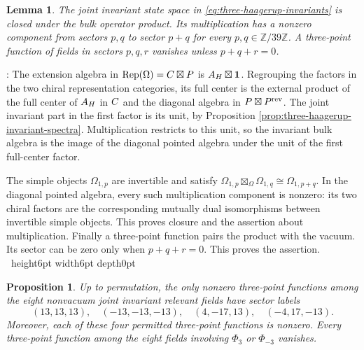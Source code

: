 \documentclass[leqno]{article}
\let\cal\relax
\newcommand{\cal}{\mathcal}
\newcommand{\Z}{\ensuremath{\mathbb{Z}}}
\newcommand{\qed}{\hfill \vrule height6pt  width6pt depth0pt}
\DeclareMathOperator{\Rep}{Rep}
\newtheorem{prop}[thm]{Proposition}
\newtheorem{lemma}[thm]{Lemma}
\newenvironment{proof}[1][]{\noindent {\it Proof #1} : }{\hbox{~}\qed
\smallskip
}
\numberwithin{equation}{section}
\begin{document}
\begin{lemma}
\label{lem:pointed-invariant-bulk-product}
The joint invariant state space in \eqref{eq:three-haagerup-invariants} is closed under the bulk operator product. Its multiplication has a nonzero component from sectors $p,q$ to sector $p+q$ for every $p,q \in \Z/39\Z$. A three-point function of fields in sectors $p,q,r$ vanishes unless $p+q+r = 0$.
\end{lemma}

\begin{proof}
The extension algebra in $\Rep(\Omega) = \cal C \boxtimes \cal P$ is $\cal A_{\cal H} \boxtimes \mathbf1$. Regrouping the factors in the two chiral representation categories, its full center is the external product of the full center of $\cal A_{\cal H}$ in $\cal C$ and the diagonal algebra in $\cal P \boxtimes \cal P^{\mathrm{rev}}$. The joint invariant part in the first factor is its unit, by Proposition \ref{prop:three-haagerup-invariant-spectra}. Multiplication restricts to this unit, so the invariant bulk algebra is the image of the diagonal pointed algebra under the unit of the first full-center factor.

The simple objects $\Omega_{1,p}$ are invertible and satisfy $\Omega_{1,p} \boxtimes_\Omega \Omega_{1,q} \cong \Omega_{1,p+q}$. In the diagonal pointed algebra, every such multiplication component is nonzero: its two chiral factors are the corresponding mutually dual isomorphisms between invertible simple objects. This proves closure and the assertion about multiplication. Finally a three-point function pairs the product with the vacuum. Its sector can be zero only when $p+q+r = 0$. This proves the assertion.
\end{proof}

\begin{prop}
\label{prop:haagerup-relevant-cubic-support}
Up to permutation, the only nonzero three-point functions among the eight nonvacuum joint invariant relevant fields have sector labels
\[
(13,13,13),\quad (-13,-13,-13),\quad (4,-17,13),\quad (-4,17,-13).
\]
Moreover, each of these four permitted three-point functions is nonzero. Every three-point function among the eight fields involving $\Phi_3$ or $\Phi_{-3}$ vanishes.
\end{prop}
\end{document}
